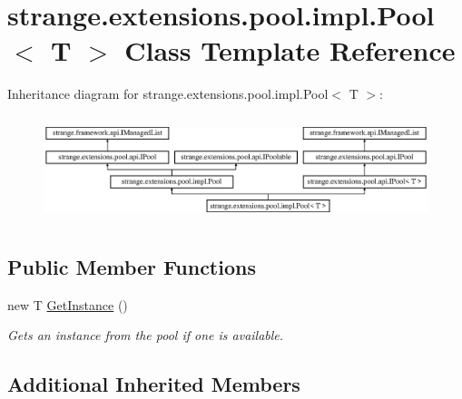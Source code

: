\hypertarget{classstrange_1_1extensions_1_1pool_1_1impl_1_1_pool_3_01_t_01_4}{\section{strange.\-extensions.\-pool.\-impl.\-Pool$<$ T $>$ Class Template Reference}
\label{classstrange_1_1extensions_1_1pool_1_1impl_1_1_pool_3_01_t_01_4}
}
Inheritance diagram for strange.\-extensions.\-pool.\-impl.\-Pool$<$ T $>$\-:\begin{figure}[H]
\begin{center}
\leavevmode
\includegraphics[height=3.124128cm]{classstrange_1_1extensions_1_1pool_1_1impl_1_1_pool_3_01_t_01_4}
\end{center}
\end{figure}
\subsection*{Public Member Functions}
\begin{DoxyCompactItemize}
\item 
new T \hyperlink{classstrange_1_1extensions_1_1pool_1_1impl_1_1_pool_3_01_t_01_4_a56a306d7432fb57b113889acd8f2dd63}{Get\-Instance} ()
\begin{DoxyCompactList}\small\item\em Gets an instance from the pool if one is available. \end{DoxyCompactList}\end{DoxyCompactItemize}
\subsection*{Additional Inherited Members}


